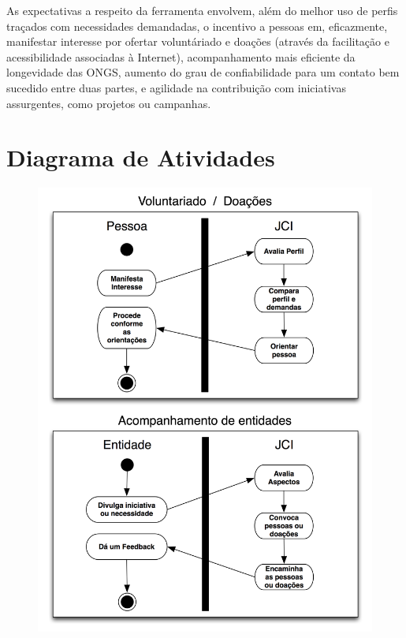 As expectativas a respeito da ferramenta envolvem, além do melhor uso de perfis traçados com necessidades demandadas, o incentivo a pessoas em, eficazmente,
manifestar interesse por ofertar voluntáriado e doações (através da facilitação e acessibilidade associadas à Internet), acompanhamento mais eficiente da 
longevidade das ONGS, aumento do grau de confiabilidade para um contato bem sucedido entre duas partes, e agilidade na contribuição com iniciativas assurgentes,
como projetos ou campanhas.

\newpage
\section{Diagrama de Atividades}

\begin{figure}[h]
  \begin{center}
    \includegraphics[scale=.195]{atv-neg.png}
   \end{center}    
\end{figure}
